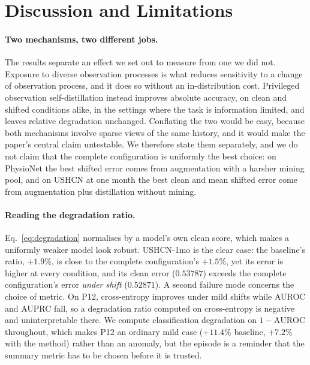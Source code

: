 
\section{Discussion and Limitations}
\label{sec:discussion}

\paragraph{Two mechanisms, two different jobs.}
The results separate an effect we set out to measure from one we did not. Exposure to diverse observation processes
is what reduces sensitivity to a change of observation process, and it does so without an in-distribution cost.
Privileged observation self-distillation instead improves absolute accuracy, on clean and shifted conditions
alike, in the settings where the task is information limited, and leaves relative degradation unchanged. Conflating
the two would be easy, because both mechanisms involve sparse views of the same history, and it would make the
paper's central claim untestable. We therefore state them separately, and we do not claim that the complete
configuration is uniformly the best choice: on PhysioNet the best shifted error comes from augmentation with a
harsher mining pool, and on USHCN at one month the best clean and mean shifted error come from augmentation plus
distillation without mining.

\paragraph{Reading the degradation ratio.}
Eq.~\ref{eq:degradation} normalises by a model's own clean score, which makes a uniformly weaker model look robust.
USHCN-1mo is the clear case: the baseline's ratio, $+1.9\%$, is close to the complete configuration's $+1.5\%$,
yet its error is higher at every condition, and its clean error ($0.53787$) exceeds the complete configuration's
error \emph{under shift} ($0.52871$). A second failure mode concerns the choice of metric. On P12, cross-entropy
improves under mild shifts while AUROC and AUPRC fall, so a degradation ratio computed on cross-entropy is
negative and uninterpretable there. We compute classification degradation on $1-\mathrm{AUROC}$ throughout, which
makes P12 an ordinary mild case ($+11.4\%$ baseline, $+7.2\%$ with the method) rather than an anomaly, but the
episode is a reminder that the summary metric has to be chosen before it is trusted.

